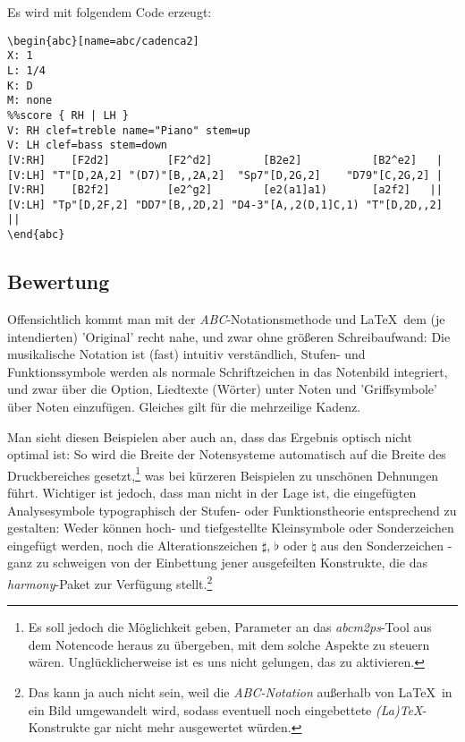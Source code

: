 Es wird mit folgendem Code erzeugt:
\begin{verbatim}
\begin{abc}[name=abc/cadenca2]
X: 1
L: 1/4 
K: D 
M: none
%%score { RH | LH }
V: RH clef=treble name="Piano" stem=up
V: LH clef=bass stem=down
[V:RH]    [F2d2]         [F2^d2]        [B2e2]           [B2^e2]   |
[V:LH] "T"[D,2A,2] "(D7)"[B,,2A,2]  "Sp7"[D,2G,2]    "D79"[C,2G,2] |
[V:RH]    [B2f2]         [e2^g2]        [e2(a1]a1)       [a2f2]   ||
[V:LH] "Tp"[D,2F,2] "DD7"[B,,2D,2] "D4-3"[A,,2(D,1]C,1) "T"[D,2D,,2] ||
\end{abc}
\end{verbatim}

\subsection{Bewertung}

Offensichtlich kommt man mit der \textit{ABC}-Notationsmethode und \LaTeX\ dem
(je intendierten) 'Original' recht nahe, und zwar ohne größeren
Schreibaufwand: Die musikalische Notation ist (fast) intuitiv verständlich, Stufen-
und Funktionssymbole werden als normale Schriftzeichen in das Notenbild
integriert, und zwar über die Option, Liedtexte (Wörter) unter Noten und
'Griffsymbole' über Noten einzufügen. Gleiches gilt für die mehrzeilige Kadenz.

Man sieht diesen Beispielen aber auch an, dass das Ergebnis optisch nicht
optimal ist: So wird die Breite der Notensysteme automatisch auf die Breite des
Druckbereiches gesetzt,\footnote{Es soll jedoch die Möglichkeit geben, Parameter
an das \textit{abcm2ps}-Tool aus dem Notencode heraus zu übergeben, mit dem
solche Aspekte zu steuern wären. Unglücklicherweise ist es uns nicht gelungen,
das zu aktivieren.} was bei kürzeren Beispielen zu unschönen Dehnungen führt.
\label{AppraisalABC}Wichtiger ist jedoch, dass man nicht in der Lage ist, die
eingefügten Analysesymbole typographisch der Stufen- oder Funktionstheorie
entsprechend zu gestalten: Weder können hoch- und tiefgestellte Kleinsymbole
oder Sonderzeichen eingefügt werden, noch die Alterationszeichen $\sharp$,
$\flat$ oder $\natural$ aus den Sonderzeichen - ganz zu schweigen von der
Einbettung jener ausgefeilten Konstrukte, die das \textit{harmony}-Paket zur
Verfügung stellt.\footnote{Das kann ja auch nicht sein, weil die
\textit{ABC-Notation} außerhalb von \LaTeX\ in ein Bild umgewandelt wird, sodass
eventuell noch eingebettete \textit{(La)\TeX}-Konstrukte gar nicht mehr
ausgewertet würden.}

